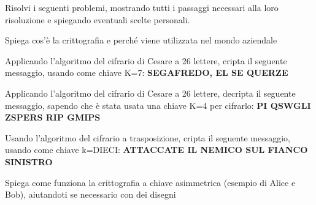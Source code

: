 \documentclass[addpoints]{exam}
\begin{document}
	
\begin{center}
\end{center}
 
\vspace{5mm}
 
 
\vspace{5mm}
 
 
 
\vspace{10mm}

Risolvi i seguenti problemi, mostrando tutti i passaggi necessari alla loro risoluzione e spiegando eventuali scelte personali.
\begin{questions}
	
\question[1] Spiega cos'è la crittografia e perché viene utilizzata nel mondo aziendale
	
\question[2] Applicando l'algoritmo del cifrario di Cesare a 26 lettere, cripta il seguente messaggio, usando come chiave K=7: \textbf{SEGAFREDO, EL SE QUERZE}

\question[2] Applicando l'algoritmo del cifrario di Cesare a 26 lettere, decripta il seguente messaggio, sapendo che è stata usata una chiave K=4 per cifrarlo: \textbf{PI QSWGLI ZSPERS RIP GMIPS}

\question[2] Usando l'algoritmo del cifrario a trasposizione, cripta il seguente messaggio, usando come chiave k=DIECI: \textbf{ATTACCATE IL NEMICO SUL FIANCO SINISTRO}

\question[3] Spiega come funziona la crittografia a chiave asimmetrica (esempio di Alice e Bob), aiutandoti se necessario con dei disegni

\end{questions}

\vspace{10mm}

\begin{center}
	\gradetable[h][questions]
\end{center}
\end{document}
